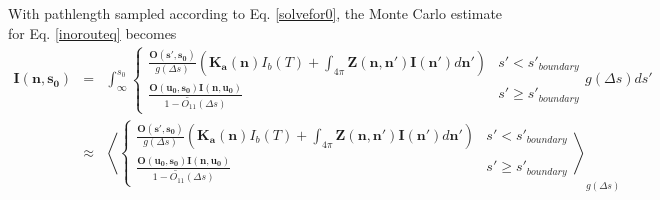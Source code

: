 With pathlength sampled according to Eq. \ref{solvefor0}, the Monte
Carlo estimate for Eq. \ref{inorouteq} becomes
\begin{eqnarray}
\mathbf{I(n,s_0)}&=&\int^{s_0}_\infty\left\{\begin{array}{rl}
\frac{\mathbf{O(s',s_0)}}{g(\Delta s)}\left(\mathbf{K_a(n)}I_b(T)
+\int_{4\pi}\mathbf{Z(n,n')}\mathbf{I(n')}d\mathbf{n'}\right) & s'< s'_{boundary} \\
\frac{\mathbf{O(u_0,s_0)I(n,u_0)}}{1-\tilde{O_{11}}(\Delta s)} & s'\ge s'_{boundary}
\end{array}g(\Delta s)ds'\right.\nonumber\\
&\approx&\left\langle\left\{\begin{array}{rl}
\frac{\mathbf{O(s',s_0)}}{g(\Delta s)}\left(\mathbf{K_a(n)}I_b(T)
+\int_{4\pi}\mathbf{Z(n,n')}\mathbf{I(n')}d\mathbf{n'}\right) & s'< s'_{boundary} \\
\frac{\mathbf{O(u_0,s_0)I(n,u_0)}}{1-\tilde{O_{11}}(\Delta s)} & s'\ge s'_{boundary}
\end{array}\right.\right\rangle_{g(\Delta s)}
\label{pathlengthint}
\end{eqnarray} 

